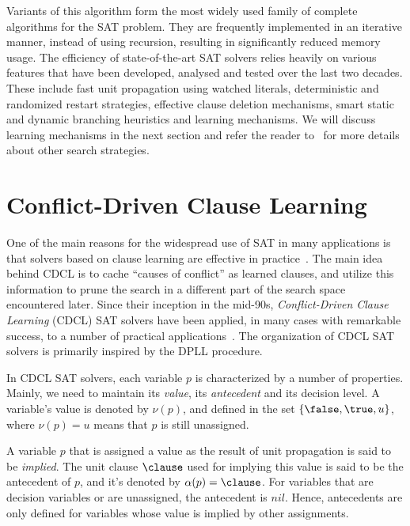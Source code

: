 Variants of this algorithm form the most widely used family of complete
algorithms for the SAT problem. They are frequently implemented in an iterative
manner, instead of using recursion, resulting in significantly reduced memory
usage. The efficiency of state-of-the-art SAT solvers relies heavily on various
features that have been developed, analysed and tested over the last two
decades. These include fast unit propagation using watched literals,
deterministic and randomized restart strategies, effective clause deletion
mechanisms, smart static and dynamic branching heuristics and learning
mechanisms. We will discuss learning mechanisms in the next section and refer
the reader to~\cite{satchapter} for more details about other search strategies.

\section{Conflict-Driven Clause Learning}%
\label{sec:cdcl}

One of the main reasons for the widespread use of SAT in many applications is
that solvers based on clause learning are effective in
practice~\cite{satchapter}. The main idea behind CDCL is to cache ``causes of
conflict'' as learned clauses, and utilize this information to prune the search
in a different part of the search space encountered later. Since their inception
in the mid-90s, \emph{Conflict-Driven Clause Learning} (CDCL) SAT solvers have
been applied, in many cases with remarkable success, to a number of practical
applications~\cite{cdclchapter}. The organization of CDCL SAT solvers is
primarily inspired by the DPLL procedure.

In CDCL SAT solvers, each variable $p$ is characterized by a number of
properties. Mainly, we need to maintain its \emph{value}, its \emph{antecedent}
and its decision level.  A variable's value is denoted by $\nu(p)$, and defined
in the set $\{\false, \true, u\}$, where $\nu(p) = u$ means that $p$ is still
unassigned. 

A variable $p$ that is assigned a value as the result of unit propagation is
said to be \emph{implied}.  The unit clause $\clause$ used for implying this
value is said to be the antecedent of $p$, and it's denoted by $\alpha(p) =
\clause$. For variables that are decision variables or are unassigned, the
antecedent is $nil$. Hence, antecedents are only defined for variables whose
value is implied by other assignments. 

